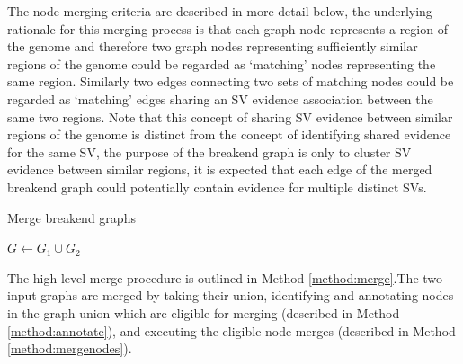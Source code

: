 \documentclass{article}
\begin{document}
The node merging criteria are described in more detail below, the underlying rationale for this merging process is that each graph node represents a region of the genome and therefore two graph nodes representing sufficiently similar regions of the genome could be regarded as `matching' nodes representing the same region. Similarly two edges connecting two sets of matching nodes could be regarded as `matching' edges sharing an SV evidence association between the same two regions. Note that this concept of sharing SV evidence between similar regions of the genome is distinct from the concept of identifying shared evidence for the same SV, the purpose of the breakend graph is only to cluster SV evidence between similar regions, it is expected that each edge of the merged breakend graph could potentially contain evidence for multiple distinct SVs.

\renewcommand{\algorithmicrequire}{\textbf{Input:}}
\renewcommand{\algorithmicensure}{\textbf{Output:}}
\newcommand*\Let[2]{\State #1 $\gets$ #2}


\begin{algorithm}[h]
\caption{Merge breakend graphs}
\label{method:merge}
\begin{algorithmic}[1]

\State $G \gets G_1 \cup G_2$
\State {}
\State {}
\EndProcedure
\end{algorithmic}
\end{algorithm}

The high level merge procedure is outlined in Method \ref{method:merge}.The two input graphs are merged by taking their union, identifying and annotating nodes in the graph union which are eligible for merging (described in Method \ref{method:annotate}), and executing the eligible node merges (described in Method \ref{method:mergenodes}). 
\end{document}
